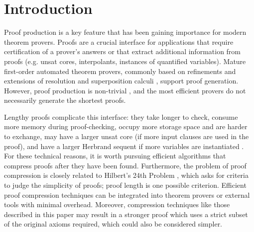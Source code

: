 \section{Introduction} 

Proof production is a key feature that has been gaining importance for modern theorem provers. Proofs are a crucial interface for applications that require certification of a prover's answers or that extract additional information from proofs (e.g. unsat cores, interpolants, instances of quantified variables). Mature first-order automated theorem provers, commonly based on refinements and extensions of resolution and superposition calculi \cite{Vampire,EProver,Spass,spassT,prover9-mace4}, support proof generation. However, proof production is non-trivial \cite{SchulzAPPA}, and the most efficient provers do not necessarily generate the shortest proofs. 





Lengthy proofs complicate this interface: they take longer to check, consume more memory during proof-checking, occupy more storage space and are harder to exchange, may have a larger unsat core (if more input clauses are used in the proof), and have a larger Herbrand sequent if more variables are instantiated \cite{B10,B16,ResolutionHerbrand,Reis}. For these technical reasons, it is worth pursuing efficient algorithms that compress proofs after they have been found. Furthermore, the problem of proof compression is closely related to Hilbert's 24th Problem \cite{Hilbert24Problem}, which asks for criteria to judge the simplicity of proofs; proof length is one possible criterion. 
Efficient proof compression techniques can be integrated into theorem provers or external tools with minimal overhead. Moreover, compression techniques like those described in this paper may result in a stronger proof which uses a strict subset of the original axioms required, which could also be considered simpler.

